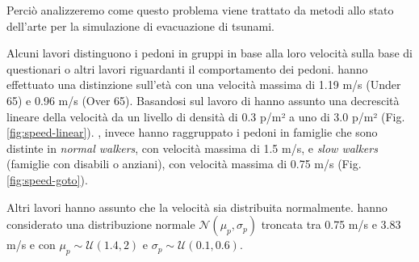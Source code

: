 Perciò analizzeremo come questo problema viene trattato da metodi allo stato dell'arte
per la simulazione di evacuazione di tsunami.

Alcuni lavori distinguono i pedoni in gruppi in base alla loro velocità sulla base di questionari o altri lavori riguardanti il comportamento dei pedoni.
\textcite{takabatake2017simulated} hanno effettuato una distinzione sull'età con una velocità massima di 1.19 m/s (Under 65) e 0.96 m/s (Over 65).
Basandosi sul lavoro di \textcite[]{older1968movement} hanno assunto una decrescità lineare della velocità da un livello di densità di 0.3 p/m² a uno di 3.0 p/m² (Fig. \ref{fig:speed-linear}).
\textcite{goto2012tsunami}, invece hanno raggruppato i pedoni in famiglie che sono distinte in \textit{normal walkers}, con velocità massima di 1.5 m/s, e
\textit{slow walkers} (famiglie con disabili o anziani), con velocità massima di 0.75 m/s (Fig. \ref{fig:speed-goto}).

Altri lavori hanno assunto che la velocità sia distribuita normalmente.
\textcite{wang2021novel} hanno considerato una distribuzione normale $\mathcal{N}(\mu_p,\sigma_p)$ troncata tra 0.75 m/s e 3.83 m/s e
con $\mu_p \sim \mathcal{U}(1.4, 2)$ e $\sigma_p \sim \mathcal{U}(0.1, 0.6)$.


